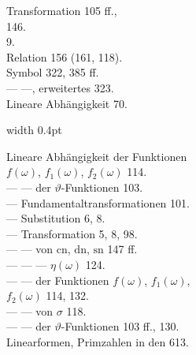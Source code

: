\begin{minipage}[t]{0.48\textwidth}
\noindent {} Transformation 105 ff.,\\
146.\\
 9.\\
 Relation 156 (161, 118).\\
 Symbol 322, 385 ff.\\
--- ---, erweitertes 323.\\
Lineare Abhängigkeit 70.
\end{minipage}%
\hfill\vrule width 0.4pt\hfill
\begin{minipage}[t]{0.48\textwidth}
\noindent Lineare Abhängigkeit der Funktionen\\
$f(\omega)$, $f_1(\omega)$, $f_2(\omega)$ 114.\\
--- --- der $\vartheta$-Funktionen 103.\\
--- Fundamentaltransformationen 101.\\
--- Substitution 6, 8.\\
--- Transformation 5, 8, 98.\\
--- --- von $\mathrm{cn}$, $\mathrm{dn}$, $\mathrm{sn}$ 147 ff.\\
--- --- --- $\eta(\omega)$ 124. \\ %
--- --- der Funktionen $f(\omega)$, $f_1(\omega)$,\\
$f_2(\omega)$ 114, 132.\\
--- --- von $\sigma$ 118.\\
--- --- der $\vartheta$-Funktionen 103 ff., 130.\\
Linearformen, Primzahlen in den 613.


\end{minipage}
